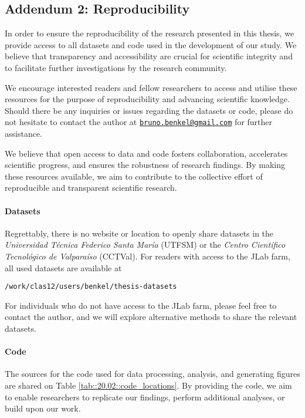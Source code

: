 \subsection*{Addendum 2: Reproducibility}
\label{20.02::reproducibility}
    In order to ensure the reproducibility of the research presented in this thesis, we provide access to all datasets and code used in the development of our study.
    We believe that transparency and accessibility are crucial for scientific integrity and to facilitate further investigations by the research community.

    We encourage interested readers and fellow researchers to access and utilise these resources for the purpose of reproducibility and advancing scientific knowledge.
    Should there be any inquiries or issues regarding the datasets or code, please do not hesitate to contact the author at \href{mailto:bruno.benkel@gmail.com}{\texttt{bruno.benkel@gmail.com}} for further assistance.

    We believe that open access to data and code fosters collaboration, accelerates scientific progress, and ensures the robustness of research findings.
    By making these resources available, we aim to contribute to the collective effort of reproducible and transparent scientific research.

    \paragraph{Datasets}
    Regrettably, there is no website or location to openly share datasets in the \textit{Universidad Técnica Federico Santa María} (UTFSM) or the \textit{Centro Científico Tecnológico de Valparaíso} (CCTVal).
    For readers with access to the JLab farm, all used datasets are available at

    \begin{center}
        \texttt{/work/clas12/users/benkel/thesis-datasets}
    \end{center}

    For individuals who do not have access to the JLab farm, please feel free to contact the author, and we will explore alternative methods to share the relevant datasets.

    \paragraph{Code}
    The sources for the code used for data processing, analysis, and generating figures are shared on Table \ref{tab::20.02::code_locations}.
    By providing the code, we aim to enable researchers to replicate our findings, perform additional analyses, or build upon our work.

